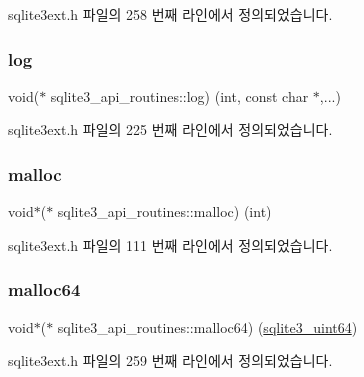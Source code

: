 sqlite3ext.\+h 파일의 258 번째 라인에서 정의되었습니다.

\mbox{\label{structsqlite3__api__routines_a0111f46a6683e3388f3ba8dd494fa04c}} 
\subsubsection{\texorpdfstring{log}{log}}
{\footnotesize\ttfamily void($\ast$ sqlite3\+\_\+api\+\_\+routines\+::log) (int, const char $\ast$,...)}



sqlite3ext.\+h 파일의 225 번째 라인에서 정의되었습니다.

\mbox{\label{structsqlite3__api__routines_a1c4b2c2102460266ffb4e7609708684a}} 
\subsubsection{\texorpdfstring{malloc}{malloc}}
{\footnotesize\ttfamily void$\ast$($\ast$ sqlite3\+\_\+api\+\_\+routines\+::malloc) (int)}



sqlite3ext.\+h 파일의 111 번째 라인에서 정의되었습니다.

\mbox{\label{structsqlite3__api__routines_a2c977ab4d411d120321302b42e3c3139}} 
\subsubsection{\texorpdfstring{malloc64}{malloc64}}
{\footnotesize\ttfamily void$\ast$($\ast$ sqlite3\+\_\+api\+\_\+routines\+::malloc64) (\hyperlink{sqlite3_8h_a181c20ecfd72bc6627635746d382c610}{sqlite3\+\_\+uint64})}



sqlite3ext.\+h 파일의 259 번째 라인에서 정의되었습니다.

